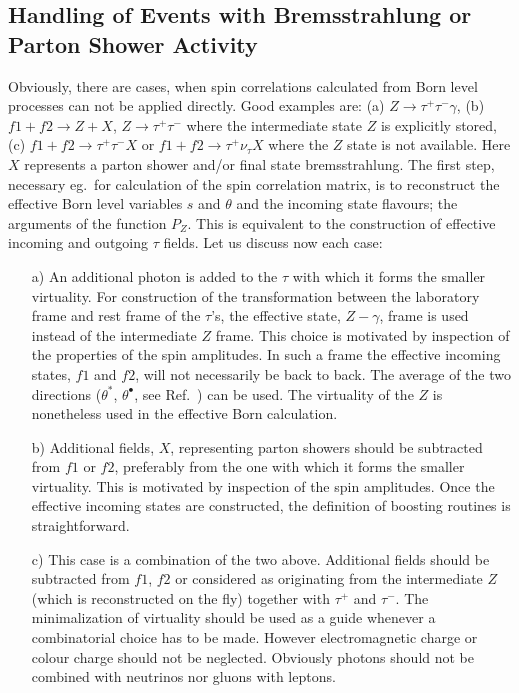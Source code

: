 \documentclass[]{Tauola_interface_design}
\begin{document}
\subsection{Handling of  Events with Bremsstrahlung or Parton Shower Activity}
\label{dwaCztery}
Obviously, there are cases, when spin correlations calculated from  Born level 
processes can not be applied directly. Good examples are:
(a) $Z \to \tau^+ \tau^- \gamma$,
(b) $f1 + f2 \to  Z + X$, $Z \to \tau^+ \tau^-$ where the intermediate
state $Z$ is explicitly stored,
 (c) $f1 + f2  \to \tau^+ \tau^- X$  or $f1 + f2  \to \tau^+ \nu_\tau X$  where the $Z$ state is not 
available. Here $X$ represents a parton shower and/or final state bremsstrahlung.
The first step, necessary eg.~for calculation of the spin correlation 
matrix, is to reconstruct the effective Born level variables $s$ and $\theta$ and the incoming state flavours; the arguments of
the function $P_Z$. This is equivalent to the construction of  effective incoming and outgoing $\tau$ fields.
Let us discuss now each case:

\begin{itemize}
\item[a)]
 An additional photon is  added to the $\tau$ with which it forms the
 smaller virtuality. For construction of the transformation between the laboratory frame and rest frame 
of the $\tau$'s, the effective state, $Z-\gamma$, frame is used instead of the intermediate $Z$ frame.
This choice is motivated by inspection of the properties of the spin amplitudes.
In such a frame the effective  incoming states, $f1$ and $f2$, will not necessarily be back to back. The average of the two directions ($\theta^*$, $\theta^\bullet$, see Ref.~\cite{Was:1989ce})
can be used. The virtuality of the $Z$ is nonetheless used in the effective Born calculation.



\item[b)] Additional fields, $X$, representing parton showers should be subtracted from $f1$ or $f2$, 
preferably from the one with which it forms the smaller virtuality.
This is motivated by inspection of the spin amplitudes.
 Once the effective incoming states are constructed, the definition of 
boosting routines is straightforward. 

\item[c)] This case  is a combination of the two above. Additional fields should be subtracted from $f1$, $f2$ or considered
as originating from the intermediate $Z$ (which is reconstructed on the fly) together with
$\tau^+$ and $\tau^-$. The minimalization of virtuality should be used as a guide whenever a combinatorial
choice has to be made. However electromagnetic
charge or colour charge should not be neglected. Obviously photons should not be combined with neutrinos nor gluons with leptons.
\end{itemize}
\end{document}
